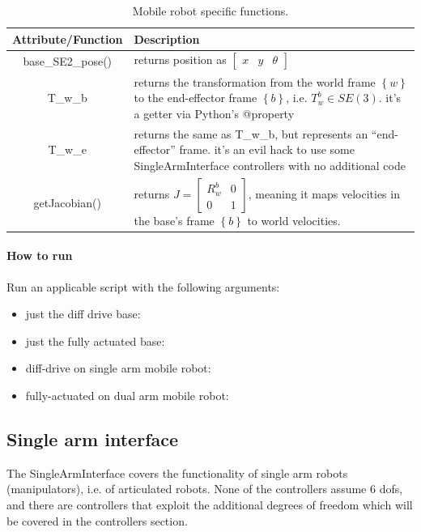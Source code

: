 \begin{table}[h!]
\centering
\label{table-mobile-base-interface}
\begin{tabular}{c | p{9cm}}
\textbf{Attribute/Function} & \textbf{Description}\\
\hline 
base\_SE2\_pose() & returns position as 
$ \begin{bmatrix} x & y & \theta \end{bmatrix}   $\\
\hline 
T\_w\_b & returns the transformation from the world
frame $ \left\{ w \right\}   $ to the end-effector frame 
$ \left\{ b \right\}   $, i.e. $ T_{ w }^{ b } \in SE (3) $. it's a getter via Python's @property\\
\hline 
T\_w\_e & returns the same as T\_w\_b, but represents an ``end-effector'' frame.
it's an evil hack to use some SingleArmInterface controllers with no additional code\\
\hline 
getJacobian() & returns 
$   J = \begin{bmatrix} 
		R_{ w }^{ b } & 0 \\
		0 & 1
\end{bmatrix} $,
meaning it maps velocities in the base's frame $ \left\{ b \right\}   $ 
to world velocities.
\\
\end{tabular}
\caption{Mobile robot specific functions.}
\end{table}

\paragraph{How to run}
Run an applicable script with the following arguments:
\begin{itemize}
		\item just the diff drive base: 
		\item just the fully actuated base:  
		\item diff-drive on single arm mobile robot: 
		\item fully-actuated on dual arm mobile robot: 
\end{itemize}


\subsection{Single arm interface}
The SingleArmInterface covers the functionality of single arm robots (manipulators), 
i.e. of articulated robots. 
None of the controllers assume 6 dofs,
and there are controllers that exploit the additional degrees of freedom
which will be covered in the controllers section.

